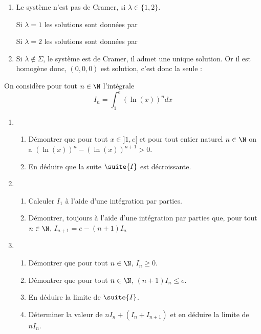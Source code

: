 \documentclass[a4paper, 11pt,reqno]{article}
\begin{document}
\begin{correction}
\begin{enumerate}
\item Le système n'est pas de Cramer, si $\lambda\in \{1,2\}$.

Si $\lambda=1$ les solutions sont données par 

Si $\lambda=2$ les solutions sont données par 

\item Si $\lambda\notin \Sigma$, le système est de Cramer, il admet une unique solution. Or il est homogène donc, $(0,0,0)$ est solution, c'est donc la seule :
\end{enumerate}
\end{correction}




\begin{exercice}
On considère pour tout $n\in \N$ l'intégrale 
$$I_n = \int_1^e (\ln(x))^n dx$$

\begin{enumerate}
\item \begin{enumerate}
\item Démontrer que pour tout $x\in ]1,e[ $ et pour tout entier naturel $n\in \N$ on  a $ (\ln(x))^n  - (\ln(x))^{n+1} >0$.
\item En déduire que la suite $\suite{I}$ est décroissante.
\end{enumerate}
\item \begin{enumerate}
\item Calculer $I_1$ à l'aide d'une intégration par parties. 
\item Démontrer, toujours à l'aide d'une intégration par parties que, pour tout $n\in \N$, $I_{n+1} = e- (n+1)I_n$
\end{enumerate}
\item \begin{enumerate}
\item Démontrer que pour tout $n\in \N$, $I_n\geq0$.
\item Démontrer que pour tout $n\in \N$, $(n+1) I_n\leq e$.
\item En déduire la limite de $\suite{I}$. 
\item Déterminer la valeur de $nI_n +(I_n+I_{n+1})$  et en déduire la limite de $nI_n$. 
\end{enumerate}
\end{enumerate}
\end{exercice}
\end{document}
